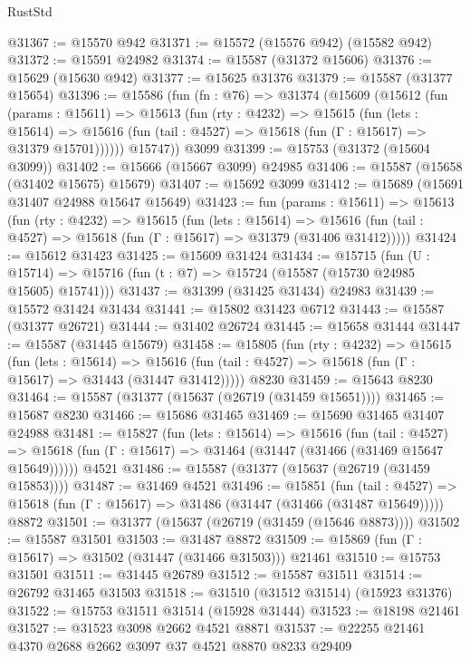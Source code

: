\begin{lexlean}{RustStd}
\begin{coremodule}
@31367 := @15570 @942
@31371 := @15572 (@15576 @942) (@15582 @942)
@31372 := @15591 @24982
@31374 := @15587 (@31372 @15606)
@31376 := @15629 (@15630 @942)
@31377 := @15625 @31376
@31379 := @15587 (@31377 @15654)
@31396 := @15586
    (fun (fn : @76) =>
    @31374
      (@15609
        (@15612
          (fun (params : @15611) =>
          @15613
            (fun (rty : @4232) =>
            @15615
              (fun (lets : @15614) =>
              @15616 (fun (tail : @4527) => @15618 (fun (Γ : @15617) => @31379 @15701))))))
        @15747))
    @3099
@31399 := @15753 (@31372 (@15604 @3099))
@31402 := @15666 (@15667 @3099) @24985
@31406 := @15587 (@15658 (@31402 @15675) @15679)
@31407 := @15692 @3099
@31412 := @15689 (@15691 @31407 @24988 @15647 @15649)
@31423 := fun (params : @15611) =>
  @15613
    (fun (rty : @4232) =>
    @15615
      (fun (lets : @15614) =>
      @15616 (fun (tail : @4527) => @15618 (fun (Γ : @15617) => @31379 (@31406 @31412)))))
@31424 := @15612 @31423
@31425 := @15609 @31424
@31434 := @15715
    (fun (U : @15714) => @15716 (fun (t : @7) => @15724 (@15587 (@15730 @24985 @15605) @15741)))
@31437 := @31399 (@31425 @31434) @24983
@31439 := @15572 @31424 @31434
@31441 := @15802 @31423 @6712
@31443 := @15587 (@31377 @26721)
@31444 := @31402 @26724
@31445 := @15658 @31444
@31447 := @15587 (@31445 @15679)
@31458 := @15805
    (fun (rty : @4232) =>
    @15615
      (fun (lets : @15614) =>
      @15616 (fun (tail : @4527) => @15618 (fun (Γ : @15617) => @31443 (@31447 @31412)))))
    @8230
@31459 := @15643 @8230
@31464 := @15587 (@31377 (@15637 (@26719 (@31459 @15651))))
@31465 := @15687 @8230
@31466 := @15686 @31465
@31469 := @15690 @31465 @31407 @24988
@31481 := @15827
    (fun (lets : @15614) =>
    @15616
      (fun (tail : @4527) =>
      @15618 (fun (Γ : @15617) => @31464 (@31447 (@31466 (@31469 @15647 @15649))))))
    @4521
@31486 := @15587 (@31377 (@15637 (@26719 (@31459 @15853))))
@31487 := @31469 @4521
@31496 := @15851
    (fun (tail : @4527) => @15618 (fun (Γ : @15617) => @31486 (@31447 (@31466 (@31487 @15649)))))
    @8872
@31501 := @31377 (@15637 (@26719 (@31459 (@15646 @8873))))
@31502 := @15587 @31501
@31503 := @31487 @8872
@31509 := @15869 (fun (Γ : @15617) => @31502 (@31447 (@31466 @31503))) @21461
@31510 := @15753 @31501
@31511 := @31445 @26789
@31512 := @15587 @31511
@31514 := @26792 @31465 @31503
@31518 := @31510 (@31512 @31514) (@15923 @31376)
@31522 := @15753 @31511 @31514 (@15928 @31444)
@31523 := @18198 @21461
@31527 := @31523 @3098 @2662 @4521 @8871
@31537 := @22255 @21461 @4370 @2688 @2662 @3097 @37 @4521 @8870 @8233 @29409

\end{coremodule}
\end{lexlean}
